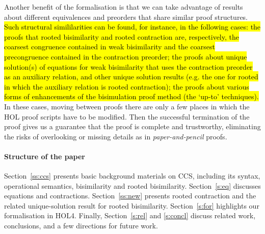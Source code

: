 Another benefit of the formalisation is 
that we can take advantage of results about different 
equivalences and preorders that share similar proof structures.
%
%
\hl{Such structural simililarities can be found, for instance, in the
following cases: the proofs that rooted bisimilarity and rooted
contraction are, respectively, the coarsest congruence contained in
weak bisimilarity and the coarsest precongruence contained in the
contraction preorder; the proofs about unique solution(s) of equations
for weak bisimilarity that uses the contraction preorder as an
auxiliary relation, and other unique solution results (e.g. the one
for rooted in which the auxiliary relation is rooted contraction); the
proofs about various forms of enhancements of the bisimulation proof
method (the `up-to' techniques).}
%
In these cases, moving between proofs there are only a few places in
which the HOL proof scripts have to be modified.
Then the successful termination of the proof gives us a guarantee that the proof is
complete and trustworthy, eliminating the risks 
of overlooking or missing details as in \emph{paper-and-pencil} proofs.

\paragraph{Structure of the paper}

Section~\ref{ss:ccs} presents basic background materials on CCS,
including its syntax, operational semantics, bisimilarity and rooted
bisimilarity.
Section~\ref{s:eq} discusses equations and contractions.
Section~\ref{ss:new} presents rooted contraction and the related
unique-solution result for rooted bisimilarity.
Section~\ref{s:for} highlights our formalisation in HOL4.
Finally,  Section~\ref{s:rel} and \ref{s:concl} discuss related work,
conclusions, and a few directions for future work.

